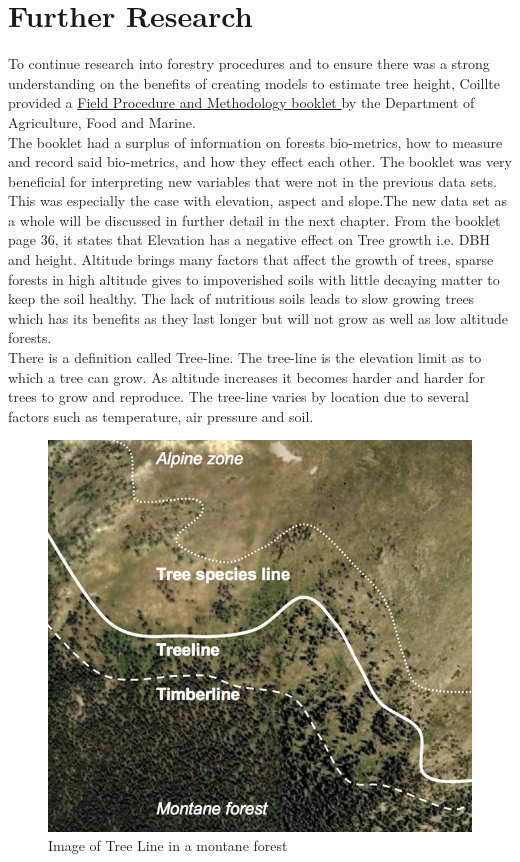 \documentclass[a4paper,11pt,twoside]{report}
\begin{document}
\chapter{Further Research}
To continue research into forestry procedures and to ensure there was a strong understanding on the benefits of creating models to estimate tree height, Coillte provided a \href{https://www.agriculture.gov.ie/media/migration/forestry/nationalforestinventory/nationalforestinventorypublications/4350NFIMethodology.pdf}{Field Procedure and Methodology booklet } by the Department of Agriculture, Food and Marine.\\
The booklet had a surplus of information on forests bio-metrics, how to measure and record said bio-metrics, and how they effect each other. The booklet was very beneficial for interpreting new variables that were not in the previous data sets. This was especially the case with elevation, aspect and slope.The new data set as a whole will be discussed in further detail in the next chapter. From the booklet page 36, it states that Elevation has a negative effect on Tree growth i.e. DBH and height. Altitude brings many factors that affect the growth of trees, sparse forests in high altitude gives to impoverished soils with little decaying matter to keep the soil healthy. The lack of nutritious soils leads to slow growing trees which has its benefits as they last longer but will not grow as well as low altitude forests.\cite{Altitude/on/tree/growth}\\
There is a definition called Tree-line. The tree-line is the elevation limit as to which a tree can grow. As altitude increases it becomes harder and harder for trees to grow and reproduce. The tree-line varies by location due to several factors such as temperature, air pressure and soil.\cite{GlobalTreelines} 
 \begin{figure}[htb]
    \centering
 \includegraphics[width=.5\linewidth]{Images/TreeLine.jpg}
  \caption{Image of Tree Line in a montane forest}
  \label{fig:Mangroves}
\end{figure}
\end{document}
